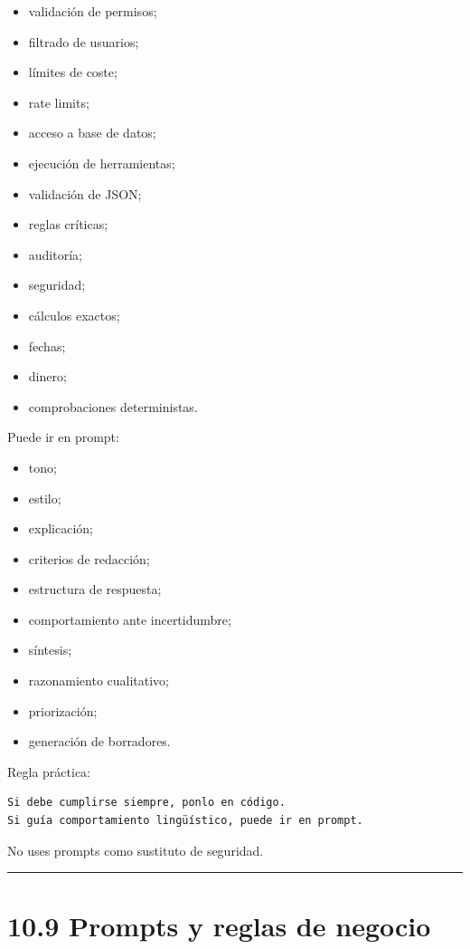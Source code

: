 \begin{itemize}
\tightlist
\item
  validación de permisos;
\item
  filtrado de usuarios;
\item
  límites de coste;
\item
  rate limits;
\item
  acceso a base de datos;
\item
  ejecución de herramientas;
\item
  validación de JSON;
\item
  reglas críticas;
\item
  auditoría;
\item
  seguridad;
\item
  cálculos exactos;
\item
  fechas;
\item
  dinero;
\item
  comprobaciones deterministas.
\end{itemize}

Puede ir en prompt:

\begin{itemize}
\tightlist
\item
  tono;
\item
  estilo;
\item
  explicación;
\item
  criterios de redacción;
\item
  estructura de respuesta;
\item
  comportamiento ante incertidumbre;
\item
  síntesis;
\item
  razonamiento cualitativo;
\item
  priorización;
\item
  generación de borradores.
\end{itemize}

Regla práctica:

\begin{lstlisting}
Si debe cumplirse siempre, ponlo en código.
Si guía comportamiento lingüístico, puede ir en prompt.
\end{lstlisting}

No uses prompts como sustituto de seguridad.

\begin{center}\rule{0.5\linewidth}{0.5pt}\end{center}

\section{10.9 Prompts y reglas de
negocio}\label{prompts-y-reglas-de-negocio}

